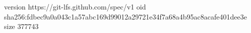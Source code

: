 version https://git-lfs.github.com/spec/v1
oid sha256:fdbec9a0a043c1a57abc169d99012a29721e34f7a68a4b95ac8acafe401dee3e
size 377743
